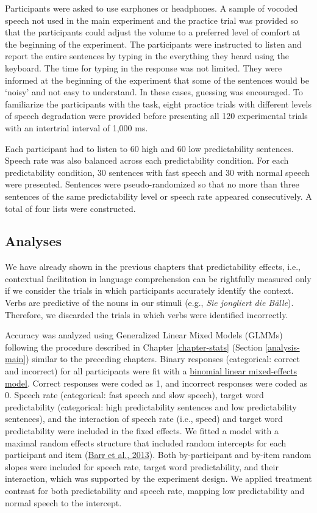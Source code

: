 \documentclass[a4paper, nobind]{templates/ociamthesis}
\begin{document}
Participants were asked to use earphones or headphones.
A sample of vocoded speech not used in the main experiment and the practice trial was provided so that the participants could adjust the volume to a preferred level of comfort at the beginning of the experiment.
The participants were instructed to listen and report the entire sentences by typing in the everything they heard using the keyboard.
The time for typing in the response was not limited.
They were informed at the beginning of the experiment that some of the sentences would be `noisy' and not easy to understand.
In these cases, guessing was encouraged.
To familiarize the participants with the task, eight practice trials with different levels of speech degradation were provided before presenting all 120 experimental trials with an intertrial interval of 1,000 ms.

Each participant had to listen to 60 high and 60 low predictability sentences.
Speech rate was also balanced across each predictability condition.
For each predictability condition, 30 sentences with fast speech and 30 with normal speech were presented.
Sentences were pseudo-randomized so that no more than three sentences of the same predictability level or speech rate appeared consecutively.
A total of four lists were constructed.

\hypertarget{analyses-3}{%
\subsection{Analyses}\label{analyses-3}}

We have already shown in the previous chapters that predictability effects, i.e., contextual facilitation in language comprehension can be rightfully measured only if we consider the trials in which participants accurately identify the context.
Verbs are predictive of the nouns in our stimuli (e.g., \emph{Sie jongliert die Bälle}).
Therefore, we discarded the trials in which verbs were identified incorrectly.

Accuracy was analyzed using Generalized Linear Mixed Models (GLMMs) following the procedure described in Chapter \ref{chapter-stats} (Section \ref{analysis-main}) similar to the preceding chapters.
Binary responses (categorical: correct and incorrect) for all participants were fit with a \protect\hyperlink{binomial-logistic-mixed-effects-model}{binomial linear mixed-effects model}.
Correct responses were coded as 1, and incorrect responses were coded as 0.
Speech rate (categorical: fast speech and slow speech), target word predictability (categorical: high predictability sentences and low predictability sentences), and the interaction of speech rate (i.e., speed) and target word predictability were included in the fixed effects.
We fitted a model with a maximal random effects structure that included random intercepts for each participant and item (\protect\hyperlink{ref-Barr2013}{Barr et al., 2013}).
Both by-participant and by-item random slopes were included for speech rate, target word predictability, and their interaction,
which was supported by the experiment design.
We applied treatment contrast for both predictability and speech rate, mapping low predictability and normal speech to the intercept.
\end{document}

